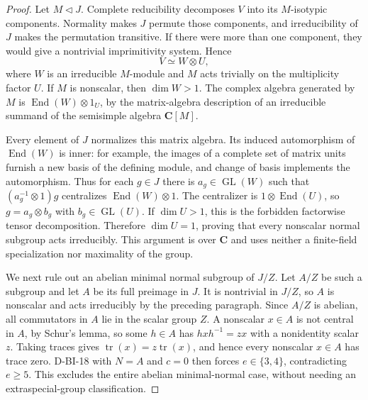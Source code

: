 \begin{proof}
Let $M\triangleleft J$.  Complete reducibility decomposes $V$ into
its $M$-isotypic components.  Normality makes $J$ permute those
components, and irreducibility of $J$ makes the permutation
transitive.  If there were more than one component, they would
give a nontrivial imprimitivity system.  Hence
\[
                  V\simeq W\otimes U,
\]
where $W$ is an irreducible $M$-module and $M$ acts trivially on
the multiplicity factor $U$.  If $M$ is nonscalar, then
$\dim W>1$.  The complex algebra generated by $M$ is
$\operatorname{End}(W)\otimes1_U$, by the matrix-algebra
description of an irreducible summand of the semisimple algebra
$\mathbf C[M]$.

Every element of $J$ normalizes this matrix algebra.  Its induced
automorphism of $\operatorname{End}(W)$ is inner: for example,
the images of a complete set of matrix units furnish a new basis
of the defining module, and change of basis implements the
automorphism.  Thus for each $g\in J$ there is
$a_g\in\operatorname{GL}(W)$ such that
$(a_g^{-1}\otimes1)g$ centralizes
$\operatorname{End}(W)\otimes1$.  The centralizer is
$1\otimes\operatorname{End}(U)$, so
$g=a_g\otimes b_g$ with $b_g\in\operatorname{GL}(U)$.
If $\dim U>1$, this is the forbidden factorwise tensor
decomposition.  Therefore $\dim U=1$, proving that every
nonscalar normal subgroup acts irreducibly.  This argument is
over $\mathbf C$ and uses neither a finite-field specialization
nor maximality of the group.

We next rule out an abelian minimal normal subgroup of $J/Z$.
Let $A/Z$ be such a subgroup and let $A$ be its full preimage in
$J$.  It is nontrivial in $J/Z$, so $A$ is nonscalar and acts
irreducibly by the preceding paragraph.  Since $A/Z$ is abelian,
all commutators in $A$ lie in the scalar group $Z$.  A nonscalar
$x\in A$ is not central in $A$, by Schur's lemma, so some
$h\in A$ has $hxh^{-1}=zx$ with a nonidentity scalar $z$.
Taking traces gives $\operatorname{tr}(x)=z\operatorname{tr}(x)$,
and hence every nonscalar $x\in A$ has trace zero.  D-BI-18 with
$N=A$ and $c=0$ then forces $e\in\{3,4\}$, contradicting
$e\ge5$.  This excludes the entire abelian minimal-normal case,
without needing an extraspecial-group classification.


\end{proof}
